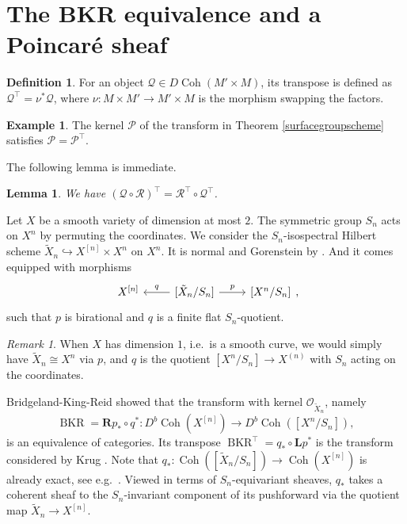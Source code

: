\documentclass{amsart}
\theoremstyle{plain}
\newtheorem{lemma}[theorem]{Lemma}
\theoremstyle{definition}
\newtheorem{definition}[theorem]{Definition}
\newtheorem{example}[theorem]{Example}
\theoremstyle{remark}
\newtheorem{remark}[theorem]{Remark}
\begin{document}
    \section{The BKR equivalence and a Poincar\'e sheaf}\label{ss:BKR}
    \begin{definition}
        For an object $\mathcal Q\in D\operatorname{Coh}(M'\times M)$, its transpose is defined as $\mathcal Q^\top=\nu^\ast\mathcal Q$, where $\nu:M\times M'\to M'\times M$ is the morphism swapping the factors.
    \end{definition}
    \begin{example}
        The kernel $\mathcal P$ of the transform in Theorem \ref{surfacegroupscheme} satisfies $\mathcal P=\mathcal P^\top$.
    \end{example}
    The following lemma is immediate.
    \begin{lemma}\label{transpose}
        We have $(\mathcal Q\circ\mathcal R)^\top=\mathcal R^\top\circ\mathcal Q^\top$.
    \end{lemma}
    Let $X$ be a smooth variety of dimension at most $2$.
    The symmetric group $S_n$ acts on $X^n$ by permuting the coordinates.
    We consider the $S_n$-isospectral Hilbert scheme $\tilde{X}_n\hookrightarrow X^{[n]}\times X^n$ on $X^n$.
    It is normal and Gorenstein by \cite[Theorem 1, \S3.8]{haiman}.
    And it comes equipped with morphisms
    \[
    \begin{tikzcd}
        X^{[n]}& {[}\tilde{X}_n/S_n{]} \arrow{l}[swap]{q}\arrow{r}{p}&{[}X^n/S_n{]}
    \end{tikzcd},
    \]
    such that $p$ is birational and $q$ is a finite flat $S_n$-quotient.
    \begin{remark}\label{BKRcurves}
        When $X$ has dimension $1$, i.e.~is a smooth curve, we would simply have $\tilde{X}_n\cong X^n$ via $p$, and $q$ is the quotient $[X^n/S_n]\to X^{(n)}$ with $S_n$ acting on the coordinates.
    \end{remark}

    Bridgeland-King-Reid \cite{BKR} showed that the transform with kernel $\mathcal O_{\tilde{X}_n}$, namely
    \[\operatorname{BKR}=\mathbf Rp_\ast\circ q^\ast:D^b\operatorname{Coh}(X^{[n]})\to D^b\operatorname{Coh}([X^n/S_n]),\]
    is an equivalence of categories.
    Its transpose $\operatorname{BKR}^\top=q_\ast\circ \mathbf Lp^\ast$ is the transform considered by Krug \cite{krug}.
    Note that $q_\ast:\operatorname{Coh}([\tilde{X}_n/S_n])\to\operatorname{Coh}(X^{[n]})$ is already exact, see e.g.~\cite[Example 12.9]{goodmodulispace}.
    Viewed in terms of $S_n$-equivariant sheaves, $q_\ast$ takes a coherent sheaf to the $S_n$-invariant component of its pushforward via the quotient map $\tilde{X}_n\to X^{[n]}$.
\end{document}
